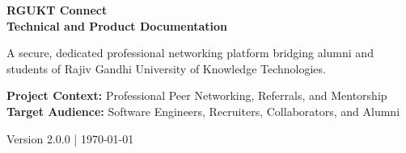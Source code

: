 \documentclass[11pt,a4paper,oneside]{report}
\begin{document}
\begin{titlepage}
    \centering
    \vspace*{1.5cm}
    
    {\Huge \bfseries \color{RguktMaroon} RGUKT Connect} \\[0.5cm]
    {\Large \bfseries \color{Charcoal} Technical and Product Documentation} \\[0.8cm]
    
    \vspace{1.5cm}
    
    
    \vspace{1.5cm}
    
    \begin{minipage}{0.8\textwidth}
        \centering
        \large \color{Charcoal}
        A secure, dedicated professional networking platform bridging alumni and students of Rajiv Gandhi University of Knowledge Technologies.
    \end{minipage}
    
    \vspace{2.5cm}
    
    \large
    \textbf{Project Context:} Professional Peer Networking, Referrals, and Mentorship \\
    \textbf{Target Audience:} Software Engineers, Recruiters, Collaborators, and Alumni \\
    
    \vfill
    
    
    \vspace{0.8cm}
    
    {\large \color{Charcoal} Version 2.0.0 | \today}
\end{titlepage}

\end{document}
